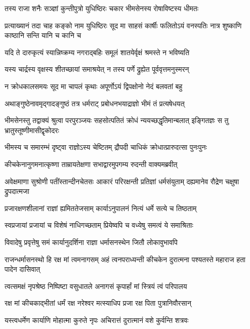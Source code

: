 \twolineshloka
{तस्य राजा शनैः सञ्ज्ञां कुन्तीपुत्रो युधिष्ठिरः}
{चकार भीमसेनस्य रोषाविष्टस्य धीमतः}


\onelineshloka
{प्रत्याख्यानं तदा चाह कङ्को नाम युधिष्ठिरः}
\twolineshloka
{सूद मा साहसं कार्षीः फलितोऽयं वनस्पतिः}
{नात्र शुष्काणि काष्ठानि सन्ति यानि च कानि च}


\twolineshloka
{यदि ते दारुकृत्यं स्यान्निष्क्रम्य नगराद्बहिः}
{समूलं शातयेर्वृक्षं श्रमस्ते न भविष्यति}


\twolineshloka
{यस्य चार्द्रस्य वृक्षस्य शीतच्छायां समाश्रयेत्}
{न तस्य पर्णे द्रुह्येत पूर्ववृत्तमनुस्मरन्}


\twolineshloka
{न क्रोधकालसमयः सूद मा चापलं कृथाः}
{अपूर्णोऽयं द्विपक्षोनो नेदं बलवतां बहु}


\twolineshloka
{अथाङ्गुष्ठेनावमृद्गादङ्गुष्ठं तत्र धर्मराट्}
{प्रबोधनभयाद्राज्ञो भीमं तं प्रत्यषेधयत्}


\threelineshloka
{भीमसेनस्तु तद्वाक्यं श्रुत्वा परपुरञ्जयः}
{सहसोत्पतितं क्रोधं न्ययच्छद्धृतिमान्बलात्}
{इङ्गितज्ञः स तु भ्रातुस्तूष्णीमासीद्वृकोदरः}


\twolineshloka
{भीमस्य च समारम्भं दृष्ट्वा राज्ञोऽस्य चेष्टितम्}
{द्रौपदी चाधिकं क्रोधात्प्रारुदत्सा पुनःपुनः}


\twolineshloka
{कीचकेनानुगमनात्कृष्णा ताम्रायतेक्षणा}
{सभाद्वारमुपगम्य रुदन्ती वाक्यमब्रवीत्}


\threelineshloka
{अवेक्षमाणा सुश्रोणी पतींस्तान्दीनचेतसः}
{आकारं परिरक्षन्ती प्रतिज्ञां धर्मसंयुताम्}
{दह्यमानेव रौद्रेण चक्षुषा द्रुपदात्मजा}


\twolineshloka
{प्रजारक्षणशीलानां राज्ञां ह्यमिततेजसाम्}
{कार्याऽनुपालनं नित्यं धर्मे सत्ये च तिष्ठताम्}


\twolineshloka
{स्वप्रजायां प्रजायां च विशेषं नाधिगच्छताम्}
{प्रियेष्वपि च वध्येषु समत्वं ये समाश्रिताः}


\twolineshloka
{विवादेषु प्रवृत्तेषु समं कार्यानुदर्शिना}
{राज्ञा धर्मासनस्थेन जितौ लोकावुभावपि}


\onelineshloka
{राजन्धर्मासनस्थो हि रक्ष मां त्वमनागसम्}
\twolineshloka
{अहं त्वनपराध्यन्ती कीचकेन दुरात्मना}
{पश्यतस्ते महाराज हता पादेन दासिवात्}


\twolineshloka
{त्वत्समक्षं नृपश्रेष्ठ निष्पिष्टा वसुधातले}
{अनागसं कृपार्हां मां स्त्रियं त्वं परिपालय}


\twolineshloka
{रक्ष मां कीचकाद्भीतां धर्मं रक्ष नरेश्वर}
{मत्स्याधिप प्रजा रक्ष पिता पुत्रानिवौरसान्}


\twolineshloka
{यस्त्वधर्मेण कार्याणि मोहात्मा कुरुते नृपः}
{अचिरात्तं दुरात्मानं वशे कुर्वन्ति शत्रवः}


